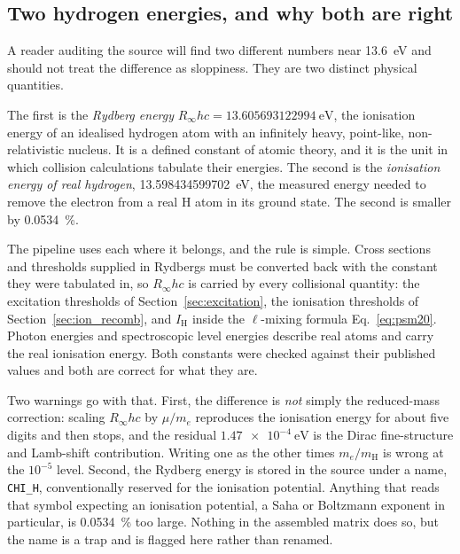 \subsection{Two hydrogen energies, and why both are right}
\label{sec:two_energies}

A reader auditing the source will find two different numbers near
\SI{13.6}{\electronvolt} and should not treat the difference as sloppiness.
They are two distinct physical quantities.

The first is the \emph{Rydberg energy} $R_\infty hc =
\SI{13.605693122994}{\electronvolt}$, the ionisation energy of an idealised
hydrogen atom with an infinitely heavy, point-like, non-relativistic nucleus. It
is a defined constant of atomic theory, and it is the unit in which collision
calculations tabulate their energies. The second is the \emph{ionisation energy
of real hydrogen}, \SI{13.598434599702}{\electronvolt}, the measured energy
needed to remove the electron from a real H atom in its ground state. The second
is smaller by \SI{0.0534}{\percent}.

The pipeline uses each where it belongs, and the rule is simple. Cross sections
and thresholds supplied in Rydbergs must be converted back with the constant
they were tabulated in, so $R_\infty hc$ is carried by every collisional
quantity: the excitation thresholds of Section~\ref{sec:excitation}, the
ionisation thresholds of Section~\ref{sec:ion_recomb}, and $I_{\mathrm H}$
inside the $\ell$-mixing formula Eq.~\eqref{eq:psm20}. Photon energies and
spectroscopic level energies describe real atoms and carry the real ionisation
energy. Both constants were checked against their published values and both are
correct for what they are.

Two warnings go with that. First, the difference is \emph{not} simply the
reduced-mass correction: scaling $R_\infty hc$ by $\mu/m_e$ reproduces the
ionisation energy for about five digits and then stops, and the residual
$\SI{1.47e-4}{\electronvolt}$ is the Dirac fine-structure and Lamb-shift
contribution. Writing one as the other times $m_e/m_{\mathrm H}$ is wrong at the
$10^{-5}$ level. Second, the Rydberg energy is stored in the source under a name,
\texttt{CHI\_H}, conventionally reserved for the ionisation potential.
Anything that reads that symbol expecting an ionisation potential, a Saha or
Boltzmann exponent in particular, is \SI{0.0534}{\percent} too large. Nothing in
the assembled matrix does so, but the name is a trap and is flagged here rather
than renamed.

